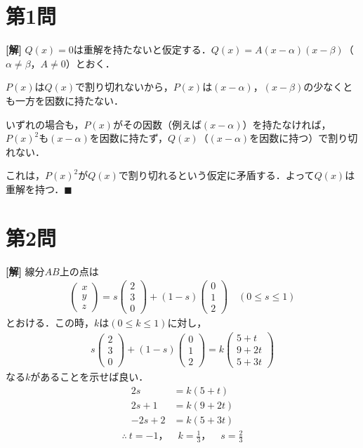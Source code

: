 \documentclass[../main.tex]{subfiles}
\begin{document}
\section*{第1問}

{\bf [解]}
$Q(x)=0$は重解を持たないと仮定する．$Q(x)=A(x-\alpha)(x-\beta)$（$\alpha\ne\beta$，$A\ne0$）とおく．

$P(x)$は$Q(x)$で割り切れないから，$P(x)$は$(x-\alpha)$，$(x-\beta)$の少なくとも一方を因数に持たない．

いずれの場合も，$P(x)$がその因数（例えば$(x-\alpha)$）を持たなければ，$P(x)^2$も$(x-\alpha)$を因数に持たず，$Q(x)$（$(x-\alpha)$を因数に持つ）で割り切れない．

これは，$P(x)^2$が$Q(x)$で割り切れるという仮定に矛盾する．よって$Q(x)$は重解を持つ．$\blacksquare$

\newpage

\section*{第2問}

{\bf [解]}
線分$AB$上の点は
\begin{align*}
  \begin{pmatrix}x\\y\\z
  \end{pmatrix}=s
  \begin{pmatrix}2\\3\\0
  \end{pmatrix}+(1-s)
  \begin{pmatrix}0\\1\\2
  \end{pmatrix}\quad(0\le s\le1)
\end{align*}
とおける．この時，$k$は$(0\le k\le1)$に対し，
\begin{align*}
  s
  \begin{pmatrix}2\\3\\0
  \end{pmatrix}+(1-s)
  \begin{pmatrix}0\\1\\2
  \end{pmatrix}=k
  \begin{pmatrix}5+t\\9+2t\\5+3t
  \end{pmatrix}
\end{align*}
なる$k$があることを示せば良い．
\begin{align*}
  2s&=k(5+t)\\
  2s+1&=k(9+2t)\\
  -2s+2&=k(5+3t)
\end{align*}
\begin{align*}
  \therefore\ t=-1，\quad k=\frac13，\quad s=\frac23
\end{align*}
\end{document}
